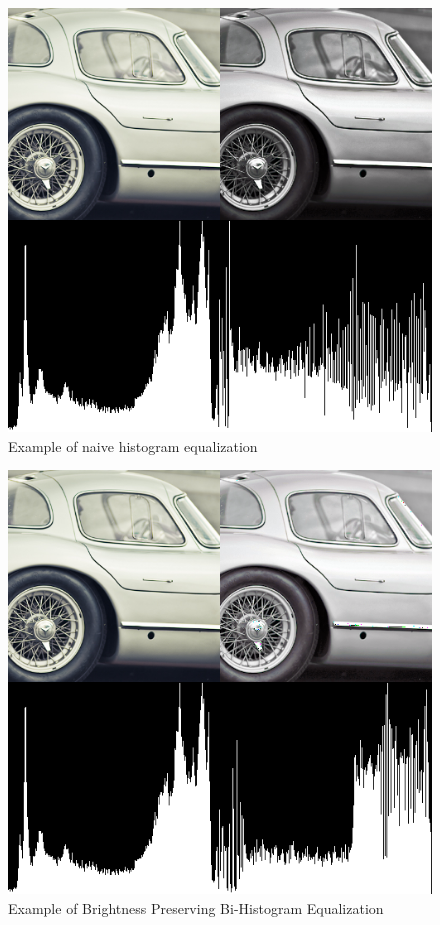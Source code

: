 \documentclass[twocolumn]{article}
\begin{document}
\begin{figure}[h!]
	\centering
	\includegraphics[scale=0.5]{regular_histogram_car}
	\caption{Example of naive histogram equalization}
\end{figure}

\begin{figure}[h!]
	\centering
	\includegraphics[scale=0.5]{regular_bright_histogram_car}
	\caption{Example of Brightness Preserving Bi-Histogram Equalization}
\end{figure}
\end{document}
